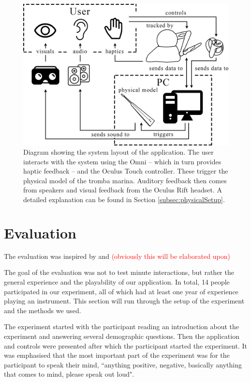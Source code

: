 \documentclass[dvipsnames, pdftex]{article}
\def\SWcomment[#1]{\textcolor{Red}{#1}}
\begin{document}
\begin{figure}[ht]\includegraphics[width=1.0\columnwidth]{SMC 2020 paper template LaTeX/figures/blockdiagram.png}
\centering
  \caption{Diagram showing the system layout of the application. The user interacts with the system using the Omni -- which in turn provides haptic feedback -- and the Oculus Touch controller. These trigger the physical model of the tromba marina. Auditory feedback then comes from speakers and visual feedback from the Oculus Rift headset. A detailed explanation can be found in Section \ref{subsec:physicalSetup}. \label{fig:systemLayout}}
\end{figure}

\section{Evaluation}
The evaluation was inspired by \cite{Young2003} \cite{Someren1994} \cite{Stowell2009} and \cite{Finstad2010} \SWcomment[(obviously this will be elaborated upon)]

The goal of the evaluation was not to test minute interactions, but rather the general experience and the playability of our application. In total, 14 people participated in our experiment, all of which had at least one year of experience playing an instrument. This section will run through the setup of the experiment and the methods we used.

The experiment started with the participant reading an introduction about the experiment and answering several demographic questions. Then the application and controls were presented after which the participant started the experiment. It was emphasised that the most important part of the experiment was for the participant to speak their mind, ``anything positive, negative, basically anything that comes to mind, please speak out loud".
\end{document}
